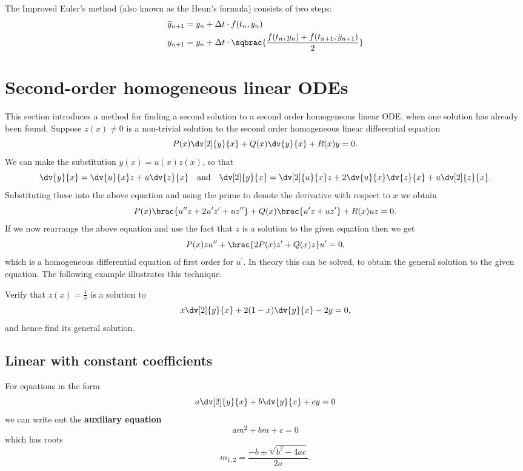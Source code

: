 The Improved Euler's method (also known as the Heun’s formula) consists of two steps:
\begin{equation}
\begin{split}
\bar{y}_{n+1}&=y_n+\Delta t\cdot f(t_n,y_n)\\
y_{n+1}&=y_n+\Delta t\cdot\sqbrac{\frac{f(t_n,y_n)+f(t_{n+1},\bar{y}_{n+1})}{2}}
\end{split}
\end{equation}
\pagebreak

\section{Second-order homogeneous linear ODEs}
This section introduces a method for finding a second solution to a second order homogeneous linear ODE, when one solution has already been found. Suppose $z(x)\neq0$ is a non-trivial solution to the second order homogeneous linear differential equation
\[ P(x)\dv[2]{y}{x}+Q(x)\dv{y}{x}+R(x)y=0. \]
We can make the substitution $y(x)=u(x)z(x)$, so that
\[ \dv{y}{x}=\dv{u}{x}z+u\dv{z}{x} \quad \text{and} \quad \dv[2]{y}{x}=\dv[2]{u}{x}z+2\dv{u}{x}\dv{z}{x}+u\dv[2]{z}{x}. \]
Substituting these into the above equation and using the prime to denote the derivative with respect to $x$ we obtain
\[ P(x)\brac{u^{\prime\prime}z+2u^\prime z^\prime+uz^{\prime\prime}}+Q(x)\brac{u^\prime z+uz^\prime}+R(x)uz=0. \]
If we now rearrange the above equation and use the fact that $z$ is a solution to the given equation then we get
\[ P(x)zu^{\prime\prime}+\brac{2P(x)z^\prime+Q(x)z}u^\prime=0, \]
which is a homogeneous differential equation of first order for $u^\prime$. In theory this can be solved, to obtain the general solution to the given equation. The following example illustrates this technique.

\begin{exercise}
Verify that $z(x)=\frac{1}{x}$ is a solution to
\[ x\dv[2]{y}{x}+2(1-x)\dv{y}{x}-2y=0, \]
and hence find its general solution.
\end{exercise}
\begin{solution}

\end{solution}


\subsection{Linear with constant coefficients}
For equations in the form 
\[ a\dv[2]{y}{x} + b\dv{y}{x} +cy = 0 \]
we can write out the \textbf{auxiliary equation}
\[ am^2+bm+c=0 \]
which has roots
\[ m_{1,2}=\frac{-b\pm \sqrt{b^2-4ac}}{2a}. \]

